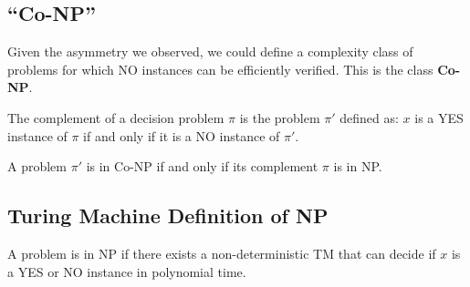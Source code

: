 \subsection{``Co-NP''}
Given the asymmetry we observed, we could define a complexity class of problems for which NO instances can be efficiently verified. This is the class \textbf{Co-NP}.

The complement of a decision problem $\pi$ is the problem $\pi'$ defined as: $x$ is a YES instance of $\pi$ if and only if it is a NO instance of $\pi'$.

A problem $\pi'$ is in Co-NP if and only if its complement $\pi$ is in NP.


\subsection{Turing Machine Definition of NP}
A problem is in NP if there exists a non-deterministic TM that can decide if $x$ is a YES or NO instance in polynomial time.













